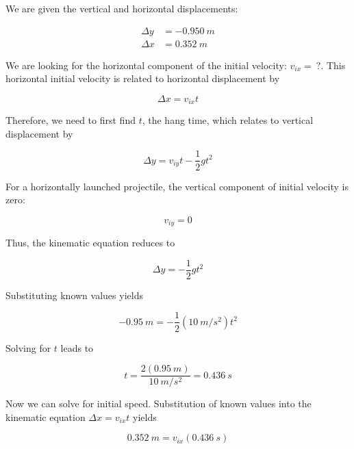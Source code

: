 \documentclass[../main-physics-workbook.tex]{subfiles}
\begin{document}
\begin{questions}
\begin{solution}
We are given the vertical and horizontal displacements:

\begin{align*}
    \Delta y &= -\SI{0.950}{m} \\[1ex]
    \Delta x &= \SI{0.352}{m}
\end{align*}

We are looking for the horizontal component of the initial velocity: $v_{ix} =\ ?$. This horizontal initial velocity is related to horizontal displacement by

\begin{equation*}
    \Delta x = v_{ix} t
\end{equation*}

Therefore, we need to first find $t$, the hang time, which relates to vertical displacement by

\begin{equation*}
    \Delta y = v_{iy} t - \frac{1}{2} g t^2
\end{equation*}


For a horizontally launched projectile, the vertical component of initial velocity is zero:

\begin{equation*}
    v_{iy} = 0
\end{equation*}

Thus, the kinematic equation reduces to

\begin{equation*}
    \Delta y = - \frac{1}{2} g t^2
\end{equation*}

Substituting known values yields

\begin{equation*}
    -\SI{0.95}{m} = - \frac{1}{2}\left(\SI{10}{m/s^2}\right)t^2
\end{equation*}

Solving for $t$ leads to

\begin{equation*}
    t = \frac{2(\SI{0.95}{m})}{\SI{10}{m/s^2}} = \SI{0.436}{s}
\end{equation*}

Now we can solve for initial speed. Substitution of known values into the kinematic equation $\Delta x = v_{ix} t$ yields

\begin{equation*}
    \SI{0.352}{m} = v_{ix} (\SI{0.436}{s})
\end{equation*}


\end{solution}
\end{questions}
\end{document}
